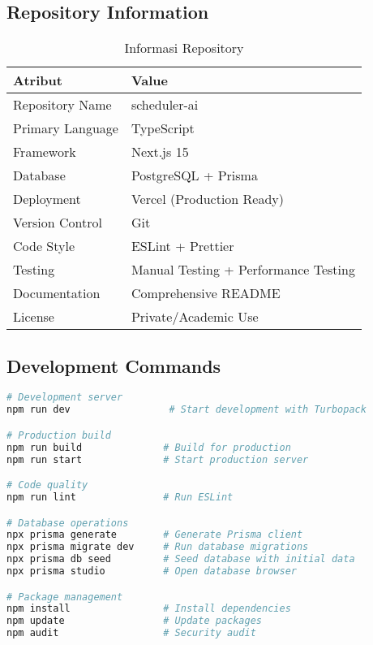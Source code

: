 \subsection{Repository Information}

\begin{table}[H]
\centering
\caption{Informasi Repository}
\begin{tabular}{|l|l|}
\hline
\textbf{Atribut} & \textbf{Value} \\
\hline
Repository Name & scheduler-ai \\
Primary Language & TypeScript \\
Framework & Next.js 15 \\
Database & PostgreSQL + Prisma \\
Deployment & Vercel (Production Ready) \\
Version Control & Git \\
Code Style & ESLint + Prettier \\
Testing & Manual Testing + Performance Testing \\
Documentation & Comprehensive README \\
License & Private/Academic Use \\
\hline
\end{tabular}
\end{table}

\subsection{Development Commands}

\begin{lstlisting}[language=bash, caption=Available Development Commands]
# Development server
npm run dev                 # Start development with Turbopack

# Production build
npm run build              # Build for production
npm run start              # Start production server

# Code quality
npm run lint               # Run ESLint

# Database operations
npx prisma generate        # Generate Prisma client
npx prisma migrate dev     # Run database migrations
npx prisma db seed         # Seed database with initial data
npx prisma studio          # Open database browser

# Package management
npm install                # Install dependencies
npm update                 # Update packages
npm audit                  # Security audit
\end{lstlisting}

